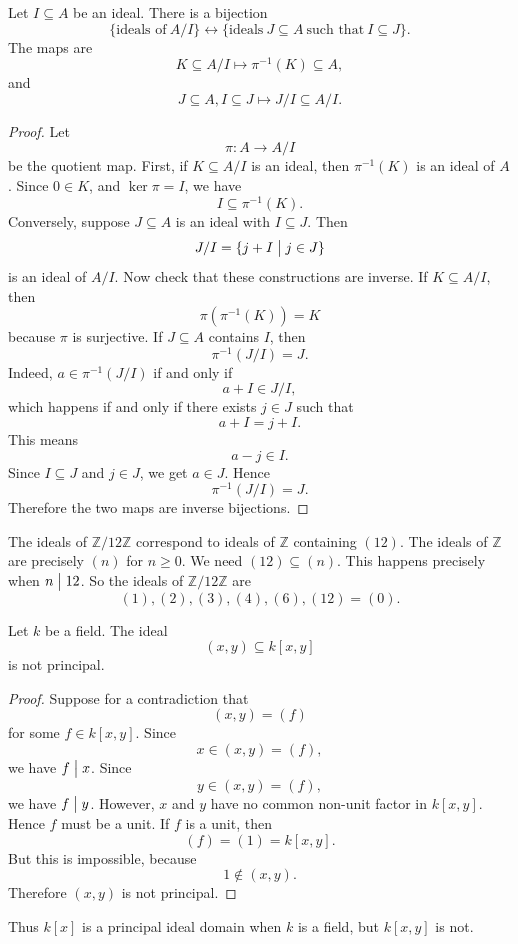 \documentclass[11pt]{article}
\begin{document}
\begin{thm}
    Let $I \subseteq A$ be an ideal. There is a bijection 
    \[
        \{\text{ideals of} \ A/I\} 
        \leftrightarrow \{\text{ideals} \ J 
        \subseteq A \ \text{such that} \ I \subseteq J\}. 
    \]
    The maps are 
    \[
        K \subseteq A/I \mapsto \pi^{-1}(K) \subseteq A, 
    \]
    and 
    \[
        J \subseteq A, I \subseteq J \mapsto 
        J/I \subseteq A/I. 
    \]
\end{thm}

\begin{proof}
    Let 
    \[
        \pi : A \to A/I
    \]
    be the quotient map. First, if $K \subseteq A/I$ is an ideal, 
    then $\pi^{-1}(K)$ is an ideal of $A$. Since $0 \in K$, and 
    $\ker \pi = I$, we have 
    \[
        I \subseteq \pi^{-1}(K).
    \]
    Conversely, suppose $J \subseteq A$ is an ideal with 
    $I \subseteq J$. Then 
    \[
        J/I = \{j + I \bigm | j \in J\}
    \]
    is an ideal of $A/I$. Now check that these constructions are 
    inverse. If $K \subseteq A/I$, then 
    \[
        \pi(\pi^{-1}(K)) = K
    \]
    because $\pi$ is surjective. If $J \subseteq A$ contains $I$, 
    then 
    \[
        \pi^{-1}(J/I) = J. 
    \]
    Indeed, $a \in \pi^{-1}(J/I)$ if and only if 
    \[
        a + I \in J/I, 
    \]
    which happens if and only if there exists $j \in J$ such that 
    \[
        a + I = j + I.
    \]
    This means 
    \[
        a - j \in I. 
    \]
    Since $I \subseteq J$ and $j \in J$, we get 
    $a \in J$. Hence 
    \[
        \pi^{-1}(J/I) = J. 
    \]
    Therefore the two maps are inverse bijections. 
\end{proof}
\begin{ex}
    The ideals of $\mathbb Z / 12 \mathbb Z$ correspond 
    to ideals of $\mathbb Z$ containing $(12)$. 
    The ideals of $\mathbb Z$ are precisely 
    $(n)$ for $n \geq 0$. We need 
    $(12) \subseteq (n)$. This happens precisely when 
    $n \bigm| 12$. So the ideals of $\mathbb Z/12\mathbb Z$ are 
    \[
        (1), (2), (3), (4), (6), (12) = (0). 
    \]
\end{ex}

\begin{prop}
    Let $k$ be a field. The ideal 
    \[
        (x,y) \subseteq k[x,y]
    \]
    is not principal. 
\end{prop}
\begin{proof}
    Suppose for a contradiction that 
    \[
        (x,y) = (f)
    \]
    for some $f \in k[x,y]$. 
    Since 
    \[
        x \in (x,y) = (f),
    \]
    we have $f \bigm| x$. Since 
    \[
        y \in (x,y) = (f), 
    \]
    we have $f \bigm| y$. However, $x$ and $y$ have no common 
    non-unit factor in $k[x,y]$. Hence $f$ must be a unit. If 
    $f$ is a unit, then 
    \[
        (f) = (1) = k[x,y].
    \]
    But this is impossible, because 
    \[
        1 \not\in (x,y). 
    \]
    Therefore $(x,y)$ is not principal. 
\end{proof}
Thus $k[x]$ is a principal ideal domain when $k$ is a field, 
but $k[x,y]$ is not. 
\end{document}
